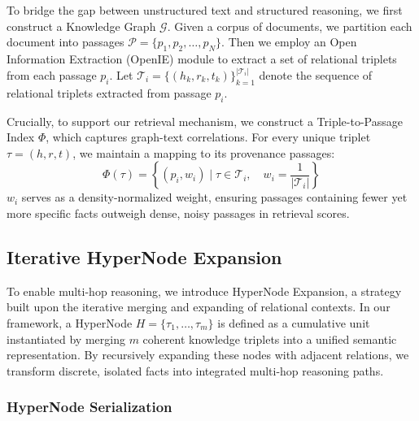 To bridge the gap between unstructured text and structured reasoning, we first construct a Knowledge Graph $\mathcal{G}$. Given a corpus of documents, we partition each document into passages $\mathcal{P} = \{p_1, p_2, \dots, p_N\}$. Then we employ an Open Information Extraction (OpenIE) module to extract a set of relational triplets from each passage $p_i$. Let $\mathcal{T}_i = \{ (h_k, r_k, t_k) \}_{k=1}^{|\mathcal{T}_i|}$ denote the sequence of relational triplets extracted from passage $p_i$.


Crucially, to support our retrieval mechanism, we construct a Triple-to-Passage Index $\Phi$, which captures graph-text correlations. For every unique triplet $\tau = (h, r, t)$, we maintain a mapping to its provenance passages:
\begin{equation}
    \Phi(\tau) = \left\{ (p_i, w_i) \mid \tau \in \mathcal{T}_i, \quad w_i = \frac{1}{|\mathcal{T}_i|} \right\}
\end{equation}
$w_i$ serves as a density-normalized weight, ensuring passages containing fewer yet more specific facts outweigh dense, noisy passages in retrieval scores.

\subsection{Iterative HyperNode Expansion}
\label{sec:hypernode_expansion}

To enable multi-hop reasoning, we introduce HyperNode Expansion, a strategy built upon the iterative merging and expanding of relational contexts. In our framework, a HyperNode $H = \{\tau_1, \dots, \tau_m\}$ is defined as a cumulative unit instantiated by merging $m$ coherent knowledge triplets into a unified semantic representation. By recursively expanding these nodes with adjacent relations, we transform discrete, isolated facts into integrated multi-hop reasoning paths.

\subsubsection{HyperNode Serialization}

